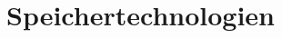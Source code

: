 \documentclass[twoside]{scrartcl}
\begin{document}
\section{Speichertechnologien}



\newpage

 

\end{document}
